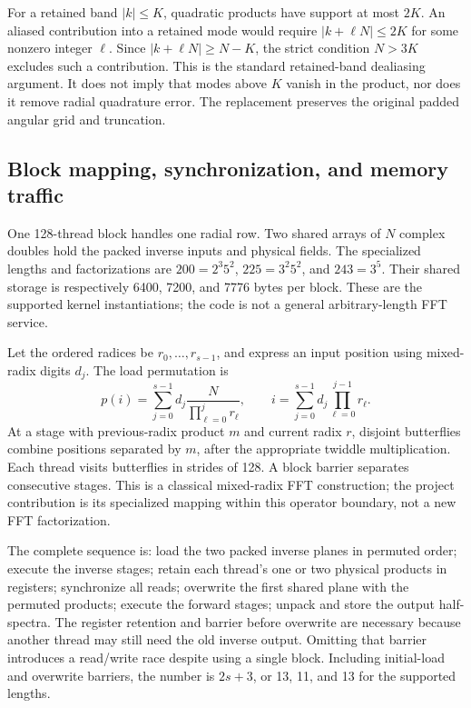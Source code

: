 For a retained band \(|k|\le K\), quadratic products have support at most \(2K\). An aliased contribution into a retained mode would require \(|k+\ell N|\le2K\) for some nonzero integer \(\ell\). Since \(|k+\ell N|\ge N-K\), the strict condition \(N>3K\) excludes such a contribution. This is the standard retained-band dealiasing argument\cite{r13}. It does not imply that modes above \(K\) vanish in the product, nor does it remove radial quadrature error. The replacement preserves the original padded angular grid and truncation.

\subsection{Block mapping, synchronization, and memory traffic}

One 128-thread block handles one radial row. Two shared arrays of \(N\) complex doubles hold the packed inverse inputs and physical fields. The specialized lengths and factorizations are \(200=2^3 5^2\), \(225=3^2 5^2\), and \(243=3^5\). Their shared storage is respectively 6400, 7200, and 7776 bytes per block. These are the supported kernel instantiations; the code is not a general arbitrary-length FFT service.

Let the ordered radices be \(r_0,\ldots,r_{s-1}\), and express an input position using mixed-radix digits \(d_j\). The load permutation is
\begin{equation}
\label{eq:op-permutation}
p(i)=\sum_{j=0}^{s-1}d_j\frac{N}{\prod_{\ell=0}^{j}r_\ell},\qquad
i=\sum_{j=0}^{s-1}d_j\prod_{\ell=0}^{j-1}r_\ell.
\end{equation}
At a stage with previous-radix product \(m\) and current radix \(r\), disjoint butterflies combine positions separated by \(m\), after the appropriate twiddle multiplication. Each thread visits butterflies in strides of 128. A block barrier separates consecutive stages. This is a classical mixed-radix FFT construction; the project contribution is its specialized mapping within this operator boundary, not a new FFT factorization.

The complete sequence is: load the two packed inverse planes in permuted order; execute the inverse stages; retain each thread's one or two physical products in registers; synchronize all reads; overwrite the first shared plane with the permuted products; execute the forward stages; unpack and store the output half-spectra. The register retention and barrier before overwrite are necessary because another thread may still need the old inverse output. Omitting that barrier introduces a read/write race despite using a single block. Including initial-load and overwrite barriers, the number is \(2s+3\), or 13, 11, and 13 for the supported lengths.

